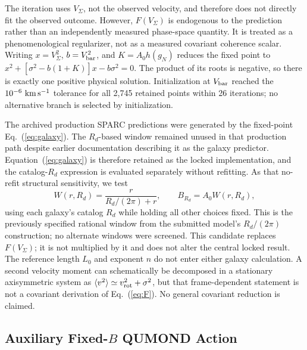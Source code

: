 \documentclass[aps,prd,reprint,superscriptaddress,showpacs,floatfix,longbibliography]{revtex4-2}
\begin{document}
The iteration uses $V_\Sigma$, not the observed velocity, and therefore does not directly fit the observed outcome. However, $F(V_\Sigma)$ is endogenous to the prediction rather than an independently measured phase-space quantity. It is treated as a phenomenological regularizer, not as a measured covariant coherence scalar. Writing $x=V_\Sigma^2$, $b=V_{\rm bar}^2$, and $K=A_0h(g_N)$ reduces the fixed point to $x^2+[\sigma^2-b(1+K)]x-b\sigma^2=0$. The product of its roots is negative, so there is exactly one positive physical solution. Initialization at $V_{\rm bar}$ reached the $10^{-6}\ {\rm km\,s^{-1}}$ tolerance for all 2,745 retained points within 26 iterations; no alternative branch is selected by initialization.

The archived production SPARC predictions were generated by the fixed-point Eq.~(\ref{eq:galaxy}). The $R_d$-based window remained unused in that production path despite earlier documentation describing it as the galaxy predictor. Equation~(\ref{eq:galaxy}) is therefore retained as the locked implementation, and the catalog-$R_d$ expression is evaluated separately without refitting. As that no-refit structural sensitivity, we test
\[
W(r,R_d)=\frac{r}{R_d/(2\pi)+r},\qquad B_{R_d}=A_0W(r,R_d),
\]
using each galaxy's catalog $R_d$ while holding all other choices fixed. This is the previously specified rational window from the submitted model's $R_d/(2\pi)$ construction; no alternate windows were screened. This candidate replaces $F(V_\Sigma)$; it is not multiplied by it and does not alter the central locked result. The reference length $L_0$ and exponent $n$ do not enter either galaxy calculation. A second velocity moment can schematically be decomposed in a stationary axisymmetric system as $\langle v^2\rangle\simeq v_{\rm rot}^2+\sigma^2$, but that frame-dependent statement is not a covariant derivation of Eq.~(\ref{eq:F}). No general covariant reduction is claimed.

\subsection{Auxiliary Fixed-$B$ QUMOND Action}
\end{document}
